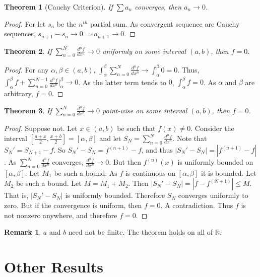\documentclass[oneside]{book}
\newtheorem{theorem}{Theorem}[section]
\theoremstyle{definition}
\newtheorem{remark}{Remark}[section]
\begin{document}
\begin{theorem}[Cauchy Criterion]
If $\sum a_n$ converges, then $a_n \rightarrow 0$.
\end{theorem}
\begin{proof}
For let $s_n$ be the $n^{th}$ partial sum. As convergent sequence are Cauchy sequences, $s_{n+1}-s_n \rightarrow 0\Rightarrow a_{n+1}\rightarrow 0$.
\end{proof}

\begin{theorem}
If $\sum_{n=0}^{N} \frac{d^{n}f}{dx^n} \rightarrow 0$ uniformly on some interval $(a,b)$, then $f=0$.
\end{theorem}
\begin{proof}
For any $\alpha, \beta\in (a,b)$, $\int_{\alpha}^{\beta} \sum_{n=0}^{N} \frac{d^{n}f}{dx^n} \rightarrow \int_{\alpha}^{\beta} 0 = 0$. Thus, $\int_{\alpha}^{\beta} f + \sum_{n=0}^{N-1} \frac{d^n f}{dx^n}\bigg|_{\alpha}^{\beta} \rightarrow 0$. As the latter term tends to $0$, $\int_{\alpha}^{\beta} f = 0$. As $\alpha$ and $\beta$ are arbitrary, $f=0$.
\end{proof}

\begin{theorem}
If $\sum_{n=0}^{N} \frac{d^n f}{dx^n} \rightarrow 0$ point-wise on some interval $(a,b)$, then $f=0$.
\end{theorem}
\begin{proof}
Suppose not. Let $x\in (a,b)$ be such that $f(x)\ne 0$. Consider the interval $[\frac{a+x}{2},\frac{x+b}{2}]=[\alpha,\beta]$ and let $S_N =\sum_{n=0}^{N} \frac{d^n f}{dx^n}$. Note that $S_N' = S_{N+1}-f$. So $S_N' - S_N = f^{(n+1)}-f$, and thus $|S_N'-S_N| = |f^{(n+1)}-f|$. As $\sum_{n=0}^{N} \frac{d^n f}{dx^n}$ converges, $\frac{d^n f}{dx^n} \rightarrow 0$. But then $f^{(n)}(x)$ is uniformly bounded on $[\alpha,\beta]$. Let $M_1$ be such a bound. As $f$ is continuous on $[\alpha,\beta]$ it is bounded. Let $M_2$ be such a bound. Let $M=M_1+M_2$. Then $|S_N'-S_N| = |f-f^{(N+1)}|\leq M$. That is, $|S_N'-S_N|$ is uniformly bounded. Therefore $S_N$ converges uniformly to zero. But if the convergence is uniform, then $f=0$. A contradiction. Thus $f$ is not nonzero anywhere, and therefore $f=0$.
\end{proof}

\begin{remark}
$a$ and $b$ need not be finite. The theorem holds on all of $\mathbb{R}$. 
\end{remark}

\section{Other Results}
\end{document}
